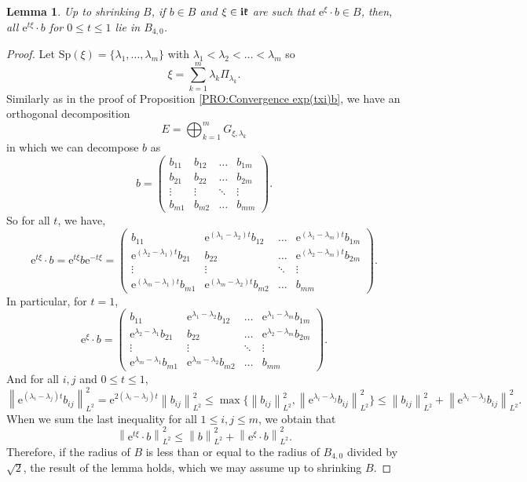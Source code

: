 \documentclass{article}
\newtheorem{lemma}[theorem]{Lemma}
\theoremstyle{remark}
\theoremstyle{definition}
\renewcommand{\i}{\boldsymbol{\mathrm{i}}}
\newcommand{\e}{\boldsymbol{\mathrm{e}}}
\newcommand{\norme}[1]{\left\| #1 \right\|}
\renewcommand{\leq}{\leqslant}
\begin{document}
\begin{lemma}\label{LEM:Convexité}
    Up to shrinking $B$, if $b \in B$ and $\xi \in \i\frak{k}$ are such that $\e^\xi \cdot b \in B$, then, all $\e^{t\xi} \cdot b$ for $0 \leq t \leq 1$ lie in $B_{4,0}$.
\end{lemma}
\begin{proof}
Let $\mathrm{Sp}(\xi) = \{\lambda_1,\ldots,\lambda_m\}$ with $\lambda_1 < \lambda_2 < \ldots < \lambda_m$ so
$$
\xi = \sum_{k = 1}^m \lambda_k\Pi_{\lambda_k}.
$$
Similarly as in the proof of Proposition \ref{PRO:Convergence exp(txi)b}, we have an orthogonal decomposition
$$
E = \bigoplus_{k = 1}^m G_{\xi,\lambda_k}
$$
in which we can decompose $b$ as
$$
b =
\begin{pmatrix}
    b_{11} & b_{12} & \hdots & b_{1m}\\
    b_{21} & b_{22} & \hdots & b_{2m}\\
    \vdots & \vdots & \ddots & \vdots\\
    b_{m1} & b_{m2} & \hdots & b_{mm}
\end{pmatrix}.
$$
So for all $t$, we have,
$$
\e^{t\xi} \cdot b = \e^{t\xi}b\e^{-t\xi} =
\begin{pmatrix}
    b_{11} & \e^{(\lambda_1 - \lambda_2)t}b_{12} & \hdots & \e^{(\lambda_1 - \lambda_m)t}b_{1m}\\
    \e^{(\lambda_2 - \lambda_1)t}b_{21} & b_{22} & \hdots & \e^{(\lambda_2 - \lambda_m)t}b_{2m}\\
    \vdots & \vdots & \ddots & \vdots\\
    \e^{(\lambda_m - \lambda_1)t}b_{m1} & \e^{(\lambda_m - \lambda_2)t}b_{m2} & \hdots & b_{mm}
\end{pmatrix}.
$$
In particular, for $t = 1$,
$$
\e^\xi \cdot b =
\begin{pmatrix}
    b_{11} & \e^{\lambda_1 - \lambda_2}b_{12} & \hdots & \e^{\lambda_1 - \lambda_m}b_{1m}\\
    \e^{\lambda_2 - \lambda_1}b_{21} & b_{22} & \hdots & \e^{\lambda_2 - \lambda_m}b_{2m}\\
    \vdots & \vdots & \ddots & \vdots\\
    \e^{\lambda_m - \lambda_1}b_{m1} & \e^{\lambda_m - \lambda_2}b_{m2} & \hdots & b_{mm}
\end{pmatrix}.
$$
And for all $i,j$ and $0 \leq t \leq 1$,
$$
\norme{\e^{(\lambda_i - \lambda_j)t}b_{ij}}_{L^2}^2 = \e^{2(\lambda_i - \lambda_j)t}\norme{b_{ij}}_{L^2}^2 \leq \max\{\norme{b_{ij}}_{L^2}^2,\norme{\e^{\lambda_i - \lambda_j}b_{ij}}_{L^2}^2\} \leq \norme{b_{ij}}_{L^2}^2 + \norme{\e^{\lambda_i - \lambda_j}b_{ij}}_{L^2}^2.
$$
When we sum the last inequality for all $1 \leq i,j \leq m$, we obtain that
$$
\norme{\e^{t\xi} \cdot b}_{L^2}^2 \leq \norme{b}_{L^2}^2 + \norme{\e^\xi \cdot b}_{L^2}^2.
$$
Therefore, if the radius of $B$ is less than or equal to the radius of $B_{4,0}$ divided by $\sqrt{2}$, the result of the lemma holds, which we may assume up to shrinking $B$.
\end{proof}
\end{document}
